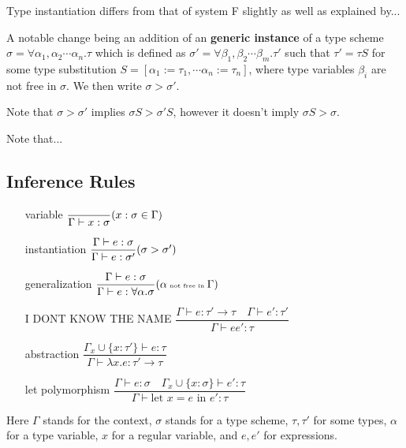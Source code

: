 Type instantiation differs from that of system F slightly as well as explained  by... %

A notable change being an addition of an \textbf{generic instance} of a type scheme $\sigma = \forall \alpha_1, \alpha_2 \cdots \alpha_n . \tau$ which is defined as $\sigma' = \forall \beta_1, \beta_2 \cdots \beta_m . \tau'$ such that
$\tau' = \tau S$ for some type substitution $S = [\alpha_1 := \tau_1, \cdots \alpha_n := \tau_n]$, where type variables $\beta_i$ are not free in $\sigma$. We then write $\sigma > \sigma'$.

Note that $\sigma > \sigma'$ implies $\sigma S > \sigma' S$, however it doesn't imply $\sigma S > \sigma$.

Note that... %

\subsection{Inference Rules}

\begin{itemize}
    \item[variable] $\dfrac{}{\Gamma \vdash x : \sigma}\tiny{(x : \sigma \in \Gamma)}$
    \item[instantiation] $\dfrac{\Gamma \vdash e : \sigma}{\Gamma \vdash e : \sigma'}\tiny{(\sigma > \sigma')}$
    \item[generalization] $\dfrac{\Gamma \vdash e : \sigma}{\Gamma \vdash e : \forall \alpha . \sigma}\tiny{(\alpha \text{ not free in }\Gamma)}$
    \item[I DONT KNOW THE NAME] $\dfrac{\Gamma \vdash e : \tau' \rightarrow \tau \quad \Gamma \vdash e' : \tau' }{\Gamma \vdash e e' : \tau}$ %
    \item[abstraction] $\dfrac{\Gamma_x \cup \{x : \tau'\} \vdash e : \tau}{\Gamma \vdash \lambda x . e : \tau' \rightarrow \tau}$ %
    \item[let polymorphism] $\dfrac{\Gamma \vdash e : \sigma \quad \Gamma_x \cup \{x :\sigma\} \vdash e' : \tau}{\Gamma \vdash \text{let } x = e \text{ in } e' : \tau}$
\end{itemize}

Here $\Gamma$ stands for the context, $\sigma$ stands for a type scheme, $\tau, \tau'$ for some types, $\alpha$ for a type variable, $x$ for a regular variable, and $e, e'$ for expressions.

